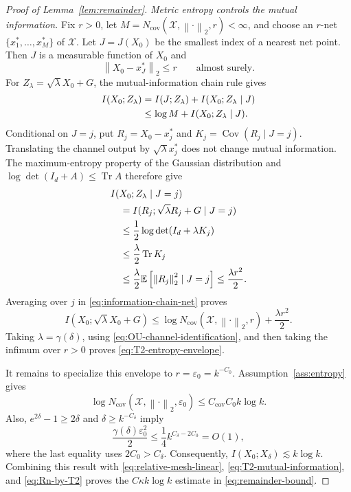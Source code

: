 \documentclass[11pt]{article}
\theoremstyle{definition}
\newcommand{\E}{\mathbb{E}}
\newcommand{\Id}{I_d}
\newcommand{\norm}[1]{\left\lVert #1\right\rVert_2}
\newcommand{\Tr}{\operatorname{Tr}}
\newcommand{\Cov}{\operatorname{Cov}}
\begin{document}
\begin{proof}[Proof of Lemma~\ref{lem:remainder}]
\medskip\noindent\emph{Metric entropy controls the mutual information.}
Fix $r>0$, let
$M=N_{\mathrm{cov}}(\mathcal X,\norm{\cdot},r)<\infty$, and choose an
$r$-net $\{x_1^*,\ldots,x_M^*\}$ of $\mathcal X$. Let $J=J(X_0)$ be
the smallest index of a nearest net point. Then $J$ is a measurable
function of $X_0$ and
\begin{equation}
    \norm{X_0-x_J^*}\le r
    \qquad\text{almost surely}.
    \label{eq:quantization-residual}
\end{equation}
For $Z_\lambda=\sqrt{\lambda}X_0+G$, the mutual-information chain rule
gives
\begin{align}
    I(X_0;Z_\lambda)
    &=
    I(J;Z_\lambda)+I(X_0;Z_\lambda\mid J)
    \notag\\
    &\le
    \log M+I(X_0;Z_\lambda\mid J).
    \label{eq:information-chain-net}
\end{align}
Conditional on $J=j$, put $R_j=X_0-x_j^*$ and
$K_j=\Cov(R_j\mid J=j)$. Translating the channel output by
$\sqrt{\lambda}x_j^*$ does not change mutual information. The
maximum-entropy property of the Gaussian distribution
\citep{cover2006elements} and
$\log\det(\Id+A)\le\Tr A$ therefore give
\begin{align}
&I(X_0;Z_\lambda\mid J=j)
\notag\\
&\quad=
I(R_j;\sqrt{\lambda}R_j+G\mid J=j)
\notag\\
&\quad\le
\frac12\log\det(\Id+\lambda K_j)
\notag\\
&\quad\le
\frac{\lambda}{2}\Tr K_j
\notag\\
&\quad\le
\frac{\lambda}{2}
\E\left[\norm{R_j}^2\mid J=j\right]
\le\frac{\lambda r^2}{2}.
\label{eq:conditional-channel-information}
\end{align}
Averaging over $j$ in \eqref{eq:information-chain-net} proves
\begin{equation}
    I(X_0;\sqrt{\lambda}X_0+G)
    \le
    \log N_{\mathrm{cov}}(\mathcal X,\norm{\cdot},r)
    +\frac{\lambda r^2}{2}.
    \label{eq:covering-information}
\end{equation}
Taking $\lambda=\gamma(\delta)$, using
\eqref{eq:OU-channel-identification}, and then taking the infimum over
$r>0$ proves \eqref{eq:T2-entropy-envelope}.

It remains to specialize this envelope to
$r=\varepsilon_0=k^{-C_0}$. Assumption~\ref{ass:entropy} gives
\[
    \log N_{\mathrm{cov}}
    (\mathcal X,\norm{\cdot},\varepsilon_0)
    \le C_{\mathrm{cov}}C_0k\log k.
\]
Also, $e^{2\delta}-1\ge2\delta$ and
$\delta\ge k^{-C_\delta}$ imply
\begin{equation}
    \frac{\gamma(\delta)\varepsilon_0^2}{2}
    \le
    \frac14 k^{C_\delta-2C_0}
    =O(1),
    \label{eq:scale-compatibility}
\end{equation}
where the last equality uses $2C_0>C_\delta$. Consequently,
$I(X_0;X_\delta)\lesssim k\log k$. Combining this result with
\eqref{eq:relative-mesh-linear},
\eqref{eq:T2-mutual-information}, and
\eqref{eq:Rn-by-T2} proves the $C\kappa k\log k$ estimate in
\eqref{eq:remainder-bound}.
\end{proof}
\end{document}
